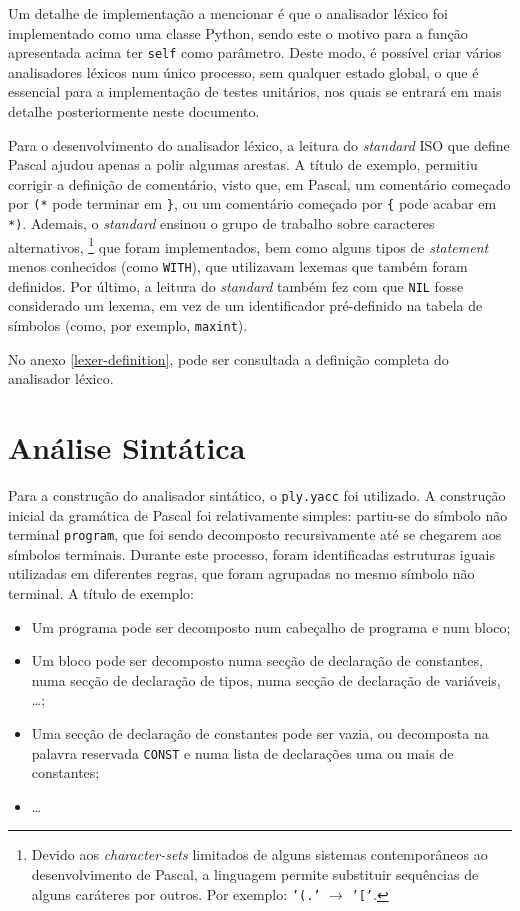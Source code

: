 \documentclass[12pt, a4paper]{article}
\begin{document}
Um detalhe de implementação a mencionar é que o analisador léxico foi implementado como uma classe
Python, sendo este o motivo para a função apresentada acima ter \texttt{self} como parâmetro. Deste
modo, é possível criar vários analisadores léxicos num único processo, sem qualquer estado global, o
que é essencial para a implementação de testes unitários, nos quais se entrará em mais detalhe
posteriormente neste documento.

Para o desenvolvimento do analisador léxico, a leitura do \emph{standard} ISO que define Pascal
ajudou apenas a polir algumas arestas. A título de exemplo, permitiu corrigir a definição de
comentário, visto que, em Pascal, um comentário começado por \texttt{(*} pode terminar em
\texttt{\}}, ou um comentário começado por \texttt{\{} pode acabar em \texttt{*)}. Ademais, o
\emph{standard} ensinou o grupo de trabalho sobre caracteres alternativos,
\footnote{
    Devido aos \emph{character-sets} limitados de alguns sistemas contemporâneos ao desenvolvimento
    de Pascal, a linguagem permite substituir sequências de alguns caráteres por outros. Por
    exemplo: \texttt{'(.'} $\rightarrow$ \texttt{'['}.
}
que foram implementados, bem como alguns tipos de
\emph{statement} menos conhecidos (como \texttt{WITH}), que utilizavam lexemas que também foram
definidos. Por último, a leitura do \emph{standard} também fez com que \texttt{NIL} fosse
considerado um lexema, em vez de um identificador pré-definido na tabela de símbolos (como, por
exemplo, \texttt{maxint}).

No anexo \ref{lexer-definition}, pode ser consultada a definição completa do analisador léxico.

\section{Análise Sintática}

Para a construção do analisador sintático, o \texttt{ply.yacc} \cite{ply} foi utilizado. A
construção inicial da gramática de Pascal foi relativamente simples: partiu-se do símbolo não
terminal \texttt{program}, que foi sendo decomposto recursivamente até se chegarem aos símbolos
terminais. Durante este processo, foram identificadas estruturas iguais utilizadas em diferentes
regras, que foram agrupadas no mesmo símbolo não terminal. A título de exemplo:

\begin{itemize}
    \item Um programa pode ser decomposto num cabeçalho de programa e num bloco;
    \item Um bloco pode ser decomposto numa secção de declaração de constantes, numa secção de
        declaração de tipos, numa secção de declaração de variáveis, \ldots;
    \item Uma secção de declaração de constantes pode ser vazia, ou decomposta na palavra reservada
        \texttt{CONST} e numa lista de declarações uma ou mais de constantes;
    \item \ldots
\end{itemize}
\end{document}
